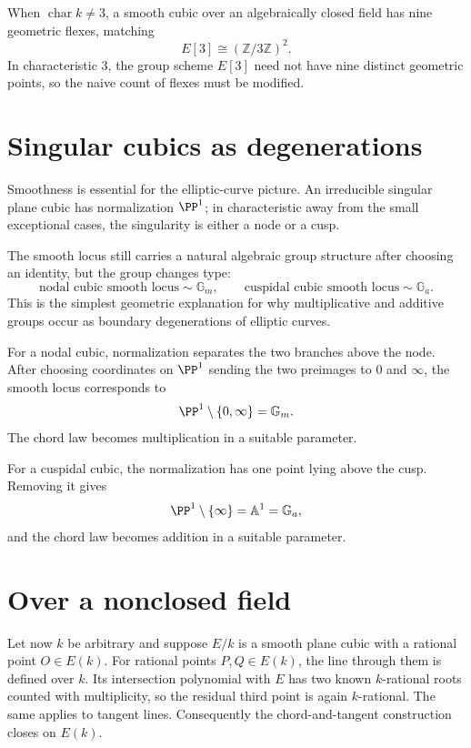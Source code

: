 When \(\operatorname{char}k\neq3\), a smooth cubic over an algebraically closed field has nine geometric flexes, matching
\[
  E[3]\cong(\mathbb Z/3\mathbb Z)^2.
\]
In characteristic \(3\), the group scheme \(E[3]\) need not have nine distinct geometric points, so the naive count of flexes must be modified.

\section{Singular cubics as degenerations}

Smoothness is essential for the elliptic-curve picture.  An irreducible singular plane cubic has normalization \(\PP^1\); in characteristic away from the small exceptional cases, the singularity is either a node or a cusp.

The smooth locus still carries a natural algebraic group structure after choosing an identity, but the group changes type:
\[
  \text{nodal cubic smooth locus}\sim \mathbb G_m,
  \qquad
  \text{cuspidal cubic smooth locus}\sim \mathbb G_a.
\]
This is the simplest geometric explanation for why multiplicative and additive groups occur as boundary degenerations of elliptic curves.

\begin{example}
For a nodal cubic, normalization separates the two branches above the node.  After choosing coordinates on \(\PP^1\) sending the two preimages to \(0\) and \(\infty\), the smooth locus corresponds to
\[
  \PP^1\setminus\{0,\infty\}=\mathbb G_m.
\]
The chord law becomes multiplication in a suitable parameter.
\end{example}

\begin{example}
For a cuspidal cubic, the normalization has one point lying above the cusp.  Removing it gives
\[
  \PP^1\setminus\{\infty\}=\mathbb A^1=\mathbb G_a,
\]
and the chord law becomes addition in a suitable parameter.
\end{example}



\section{Over a nonclosed field}

Let now \(k\) be arbitrary and suppose \(E/k\) is a smooth plane cubic with a rational point \(O\in E(k)\).  For rational points \(P,Q\in E(k)\), the line through them is defined over \(k\).  Its intersection polynomial with \(E\) has two known \(k\)-rational roots counted with multiplicity, so the residual third point is again \(k\)-rational.  The same applies to tangent lines.  Consequently the chord-and-tangent construction closes on \(E(k)\).

